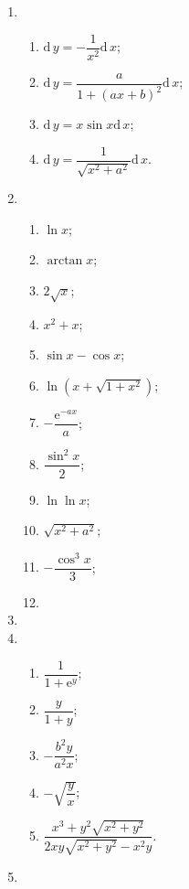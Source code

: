 \documentclass[a4paper, 11pt]{ctexart}
\newcommand{\diff}{\mathrm{d}\,}
\begin{document}
\pagestyle{empty}
\begin{enumerate}
    \item %
        \begin{enumerate}[(1)]
            \item %
                $\diff y = -\dfrac{1}{x^2}\diff x$;
            \item %
                $\diff y = \dfrac{a}{1 + (ax+b)^2}\diff x$;
            \item %
                $\diff y = x\sin x\diff x$;
            \item %
                $\diff y = \dfrac{1}{\sqrt{x^2 + a^2}}\diff x$.
        \end{enumerate}
    \item %
        \begin{enumerate}[(1)]
            \item %
                $\ln x$;
            \item %
                $\arctan x$;
            \item %
                $2\sqrt{x}$;
            \item %
                $x^2 + x$;
            \item %
                $\sin x - \cos x$;
            \item %
                $\ln(x + \sqrt{1+x^2})$;
            \item %
                $-\dfrac{\mathrm{e}^{-ax}}{a}$;
            \item %
                $\dfrac{\sin^2x}{2}$;
            \item %
                $\ln\ln x$;
            \item %
                $\sqrt{x^2 + a^2}$;
            \item %
                $-\dfrac{\cos^3x}{3}$;
            \item %
        \end{enumerate}
    \item %
    \item %
        \begin{enumerate}[(1)]
            \item %
                $\dfrac{1}{1 + \mathrm{e}^y}$;
            \item %
                $\dfrac{y}{1 + y}$;
            \item %
                $-\dfrac{b^2y}{a^2x}$;
            \item %
                $-\sqrt{\dfrac yx}$;
            \item %
                $\dfrac{x^3 + y^2\sqrt{x^2+y^2}}{2xy\sqrt{x^2+y^2} - x^2y}$.
        \end{enumerate}
    \item %
\end{enumerate}
\end{document}
